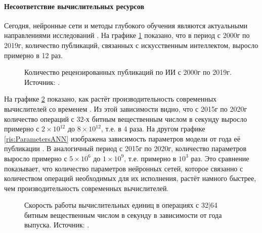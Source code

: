 \paragraph{Несоответствие вычислительных ресурсов}
Сегодня, нейронные сети и методы глубокого обучения являются актуальными направлениями исследований \cite{zhang2021ai}. На графике \ref{ris:PublicationsAI} показано, что в период с 2000г по 2019г, количество публикаций, связанных с искусственным интеллектом, выросло примерно в 12 раз.
\begin{figure}[h!]
	\caption{Количество рецензированных публикаций по ИИ с 2000г по 2019г. Источник: \cite{zhang2021ai}.}
	\label{ris:PublicationsAI}
\end{figure}
На графике \ref{ris:PerfomanceGPUCPU} показано, как растёт производительность современных вычислителей со временем \cite{sun2019summarizing}. Из этой зависимости видно, что с 2015г по 2020г количество операций с $32$-х битным вещественным числом в секунду выросло примерно с $2\times10^{12}$ до $8\times10^{12}$, т.е. в 4 раза. На другом графике \ref{ris:ParametersANN} изображена зависимость параметров модели от года её публикации \cite{bernstein2021freely}. В аналогичный период с 2015г по 2020г, количество параметров выросло примерно с $5\times10^{6}$ до $1\times10^{9}$, т.е. примерно в $10^{3}$ раз. Это сравнение показывает, что количество параметров нейронных сетей, которое связанно с количеством операций необходимых для их исполнения, растёт намного быстрее, чем производительность современных вычислителей.
\begin{figure}[h!]
	\caption{Скорость работы вычислительных единиц в операциях с 32|64 битным вещественным числом в секунду в зависимости от года выпуска. Источник: \cite{sun2019summarizing}.}
	\label{ris:PerfomanceGPUCPU}
\end{figure}
